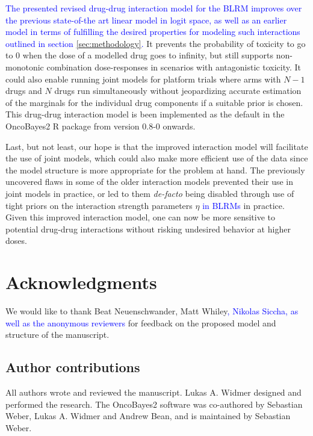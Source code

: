 \documentclass[AMA,STIX1COL]{WileyNJD-v2}
\newcommand{\revision}[1]{\textcolor{blue}{#1}}
\begin{document}
\revision{The presented revised drug-drug interaction model for the BLRM improves over the previous state-of-the art linear model in logit space, as well as an earlier model\citep{Thall2003} in terms of fulfilling the desired properties for modeling such interactions outlined in section \ref{sec:methodology}.} It prevents the probability of toxicity to go to 0 when the dose of a modelled drug goes to infinity, but still supports non-monotonic combination dose-responses in scenarios with antagonistic toxicity. It could also enable running joint models for platform trials where arms with $N - 1$ drugs and $N$ drugs run simultaneously without jeopardizing accurate estimation of the marginals for the individual drug components if a suitable prior is chosen. This drug-drug interaction model is been implemented as the default in the OncoBayes2 R package from version 0.8-0 onwards.

Last, but not least, our hope is that the improved interaction model will facilitate the use of joint models, which could also make more efficient use of the data since the model structure is more appropriate for the problem at hand. The previously uncovered flaws in some of the older interaction models prevented their use in joint models in practice, or led to them \emph{de-facto} being disabled through use of tight priors on the interaction strength parameters $\eta$ \revision{in BLRMs} in practice. Given this improved interaction model, one can now be more sensitive to potential drug-drug interactions without risking undesired behavior at higher doses.




\section*{Acknowledgments}
We would like to thank Beat Neuenschwander, Matt Whiley\revision{, Nikolas Siccha, as well as the anonymous reviewers} for feedback on the proposed model and structure of the manuscript.

\subsection*{Author contributions}
All authors wrote and reviewed the manuscript. Lukas A. Widmer designed and performed the research. The OncoBayes2 software was co-authored by Sebastian Weber, Lukas A. Widmer and Andrew Bean, and is maintained by Sebastian Weber.
\end{document}
